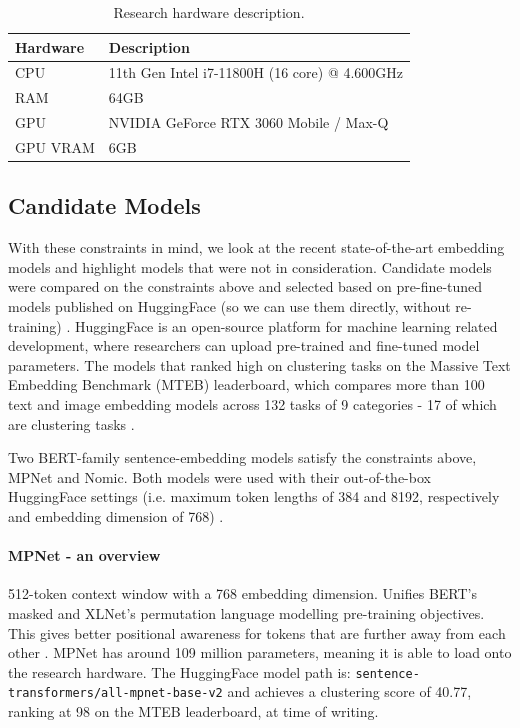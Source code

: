 \documentclass[10pt,oneside]{report}
\begin{document}
\begin{table}[htbp]
    \fontsize{8}{12}\selectfont
    \centering
    \begin{adjustbox}{max width=\textwidth}
        \begin{tabular}{p{3cm}|p{10cm}}
        \toprule
        \textbf{Hardware} & \textbf{Description} \\
        \midrule
        {CPU} & {11th Gen Intel i7-11800H (16 core) @ 4.600GHz} \\
        {RAM} & {64GB} \\
        {GPU} & {NVIDIA GeForce RTX 3060 Mobile / Max-Q} \\
        {GPU VRAM} & {6GB} \\
        \bottomrule
    \end{tabular}
    \end{adjustbox}
    \caption{Research hardware description.}
    \label{tab:researchHw}
\end{table}


\subsection{Candidate Models}

With these constraints in mind, we look at the recent state-of-the-art embedding models and highlight models that were not in consideration. Candidate models were compared on the constraints above and selected based on pre-fine-tuned models published on HuggingFace (so we can use them directly, without re-training) \cite{wolf2019huggingface}. HuggingFace is an open-source platform for machine learning related development, where researchers can upload pre-trained and fine-tuned model parameters. The models that ranked high on clustering tasks on the Massive Text Embedding Benchmark (MTEB) leaderboard, which compares more than 100 text and image embedding models across 132 tasks of 9 categories - 17 of which are clustering tasks \cite{muennighoff2022mteb}. 

Two BERT-family sentence-embedding models satisfy the constraints above, MPNet and Nomic. Both models were used with their out-of-the-box HuggingFace settings (i.e. maximum token lengths of 384 and 8192, respectively and embedding dimension of 768) \cite{song2020mpnet, nussbaum2024nomic, nussbaum2024nomic1.5}.

\paragraph{MPNet - an overview}
512-token context window with a 768 embedding dimension. Unifies BERT's masked and XLNet's permutation language modelling pre-training objectives. This gives better positional awareness for tokens that are further away from each other \cite{song2020mpnet}. MPNet has around 109 million parameters, meaning it is able to load onto the research hardware. The HuggingFace model path is: \texttt{sentence-transformers/all-mpnet-base-v2} and achieves a clustering score of 40.77, ranking at 98 on the MTEB leaderboard, at time of writing.
\end{document}
